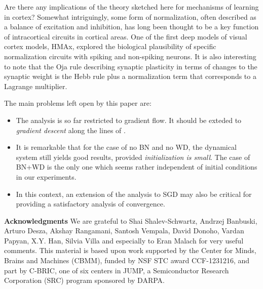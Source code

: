 \documentclass[11pt]{article}
\begin{document}
   Are there any implications of the theory sketched here for
    mechanisms of learning in cortex? Somewhat intriguingly, some form
    of normalization, often described as a balance of excitation and inhibition, has long
    been thought to be a key function of intracortical circuits
    in cortical areas\cite{DouglasMartin2004}. One of the first deep models of visual cortex
    models, HMAx, explored the biological plausibility of specific
    normalization circuits with spiking and non-spiking neurons. It is
    also interesting to note that the Oja rule describing synaptic
    plasticity in terms of changes to the synaptic weight
    is the Hebb rule plus a normalization term that corresponds to a
    Lagrange multiplier.

    
  The main problems left open by this paper are:
    \begin{itemize}

      \item The analysis is so far restricted to gradient flow. It
        should be exteded to  {\it gradient descent} along the lines
        of \cite{DBLP:journals/corr/abs-1812-03981}.
        \item It is remarkable that for the case of no BN
          and no WD, the  dynamical system still yields good results, provided
         {\it initialization is small}. The case of BN+WD is the only one
          which seems rather independent of initial conditions in our experiments.
          \item In this context, an extension of the analysis to SGD may also be critical for
  providing a satisfactory analysis of convergence.
 \end{itemize}



	\vskip0.1in

        {\bf Acknowledgments} We are grateful to Shai Shalev-Schwartz,
        Andrzej Banbuski, Arturo Desza, Akshay Rangamani, Santosh
        Vempala, David Donoho, Vardan Papyan, X.Y. Han, Silvia Villa and especially
        to Eran Malach for very useful comments.  This material is
        based upon work supported by the Center for Minds, Brains and
        Machines (CBMM), funded by NSF STC award CCF-1231216, and part
        by C-BRIC, one of six centers in JUMP, a Semiconductor
        Research Corporation (SRC) program sponsored by DARPA.



	\newpage

	\small
	
	
	\normalsize
\end{document}
